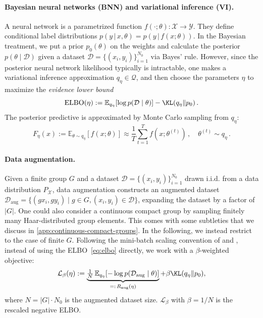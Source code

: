 \documentclass{article}
\begin{document}
\paragraph{Bayesian neural networks (BNN) and variational inference (VI).} A neural network is a parametrized function $f(\cdot; \theta): \mathcal{X} \rightarrow \mathcal{Y}$. They define conditional label distributions $p(y\, \vert \, x, \theta) = p(y\, \vert \, f(x;\theta))$. In the Bayesian treatment, we put a prior $p_{0}(\theta)$ on the weights and calculate the posterior $p(\theta \mid \mathcal{D})$ given a dataset $\mathcal{D} = \{(x_{i}, y_{i})\}_{i=1}^{N_{0}}$ via Bayes' rule. However, since the posterior neural network likelihood typically is intractable, one makes a variational inference approximation $q_\eta \in \mathcal{Q}$, and then choose the parameters $\eta$  to maximize the \emph{evidence lower bound} \citep{bishopPatternRecognitionMachine2006}
\begin{equation}
    \mathrm{ELBO}(\eta) := 
    \mathbb{E}_{q_{\eta}}
    [\log p(\mathcal{D} \mid \theta)] 
    - \KL(q_{\eta} \Vert p_{0})\,.
    \label{eq:elbo}
\end{equation}
The posterior predictive is approximated by Monte Carlo sampling from $q_\eta$:
\begin{equation}
    F_\eta(x) := \mathbb{E}_{\theta \sim q_{\eta}} [f(x;\theta)] \approx \frac{1} {T}\sum_{t=1}^{T} f(x;\theta^{(t)})\,, \quad \theta^{(t)} \sim q_\eta\,.
    \label{eq:post-predictive}
\end{equation}

\paragraph{Data augmentation.} Given a finite group $G$ and a dataset $\mathcal{D} = \{(x_{i}, y_{i})\}_{i=1}^{N_{0}}$ drawn i.i.d. from a data distribution $P_{\mathcal{X}}$, data augmentation constructs an augmented dataset $\mathcal{D}_{\mathrm{aug}} = \{(gx_{i}, gy_{i}) \mid g \in G, (x_{i},y_{i}) \in \mathcal{D}\}$, expanding the dataset by a factor of $|G|$.
One could also consider a  continuous compact group
by sampling finitely many Haar-distributed group elements.
This comes with some subtleties that we discuss in \cref{app:continuous-compact-groups}. In the following, we instead restrict to the case of finite $G$. Following the mini-batch scaling convention of \citet{gravesPracticalVariationalInference2011} and \citet{blundell2015}, instead of using the ELBO~\eqref{eq:elbo} directly, we work with a $\beta$-weighted objective:
\begin{equation}
    \mathcal{L}_{\beta}(\eta) := \underbrace{\tfrac{1}{N}\,\mathbb{E}_{q_{\eta}}[-\log p(\mathcal{D}_{\mathrm{aug}} \mid \theta)]}_{=:\,R_{\mathrm{aug}}(\eta)} + \beta \KL(q_{\eta} \Vert p_{0}),
    \label{equ:L-beta}
\end{equation}
where $N = |G| \cdot N_{0}$ is the augmented dataset size. $\mathcal{L}_{\beta}$ with $\beta = 1/N$ is the rescaled negative ELBO.
\end{document}
